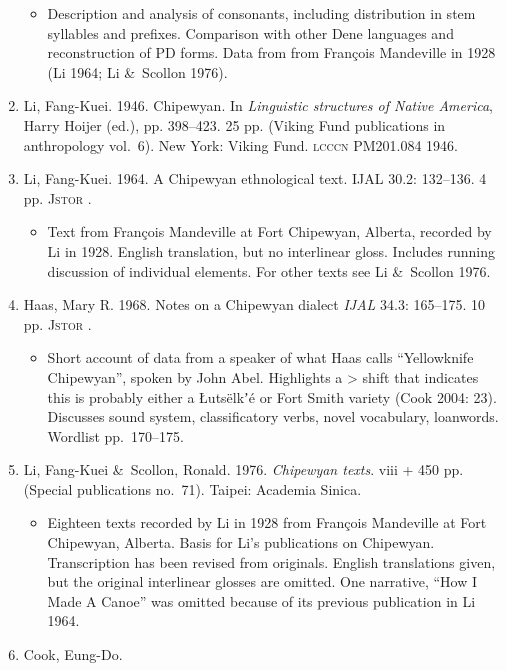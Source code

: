 \documentclass[12pt,letterpaper,oneside,article]{memoir}
\begin{document}
\begin{enumerate}
\begin{itemize}
	\item	Description and analysis of consonants, including distribution in stem
		syllables and prefixes.
		Comparison with other Dene languages and reconstruction of PD forms.
		Data from from François Mandeville in 1928 (Li 1964; Li \&\ Scollon
		1976).
	\end{itemize}
\item	Li, Fang-Kuei.
	1946.
	Chipewyan.
	In \textit{Linguistic structures of Native America}, Harry Hoijer (ed.), pp. 398–423.
	25 pp.
	(Viking Fund publications in anthropology vol.\ 6).
	New York: Viking Fund.
	\textsc{lcccn} PM201.084 1946.
\item	Li, Fang-Kuei.
	1964.
	A Chipewyan ethnological text.
	\textsc{IJAL} 30.2: 132–136.
	4 pp.
	\textsc{Jstor} .
	\begin{itemize}
	\item	Text from François Mandeville at Fort Chipewyan, Alberta, recorded by Li
		in 1928.
		English translation, but no interlinear gloss.
		Includes running discussion of individual elements.
		For other texts see Li \&\ Scollon 1976.
	\end{itemize}
\item	Haas, Mary R.
	1968.
	Notes on a Chipewyan dialect
	\textit{IJAL} 34.3: 165–175.
	10 pp.
	\textsc{Jstor} .
	\begin{itemize}
	\item	Short account of data from a speaker of what Haas calls “Yellowknife Chipewyan”,
		spoken by John Abel.
		Highlights a  >  shift that indicates this is probably
		either a Łutsëlkʼé or Fort Smith variety (Cook 2004: 23).
		Discusses sound system, classificatory verbs, novel vocabulary, loanwords.
		Wordlist pp.\ 170–175.
	\end{itemize}
\item	Li, Fang-Kuei \&\ Scollon, Ronald.
	1976.
	\textit{Chipewyan texts}.
	viii + 450 pp.
	(Special publications no.\ 71).
	Taipei: Academia Sinica.
	\begin{itemize}
	\item	Eighteen texts recorded by Li in 1928 from François Mandeville at Fort
		Chipewyan, Alberta.
		Basis for Li’s publications on Chipewyan.
		Transcription has been revised from originals.
		English translations given, but the original interlinear glosses
		are omitted.
		One narrative, “How I Made A Canoe” was omitted because of its previous
		publication in Li 1964.
	\end{itemize}
\item	Cook, Eung-Do.

\end{enumerate}
\end{document}
